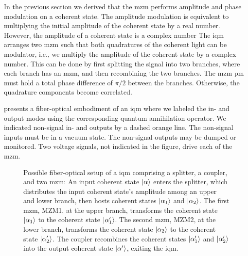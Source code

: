 In the previous section we derived that the \gls{mzm} performs amplitude and phase modulation on a coherent state.
The amplitude modulation is equivalent to multiplying the initial amplitude of the coherent state by a real number.
However, the amplitude of a coherent state is a complex number
The \gls{iqm} arranges two \gls{mzm} such that both quadratures of the coherent light can be modulator, i.e., we multiply the amplitude of the coherent state by a complex number.
This can be done by first splitting the signal into two branches, where each branch has an \gls{mzm}, and then recombining the two branches.
The \gls{mzm} \gls{pm} must hold a total phase difference of $\pi/2$ between the branches.
Otherwise, the quadrature components become correlated.

 presents a fiber-optical embodiment of an \gls{iqm} where we labeled the in- and output modes using the corresponding quantum annihilation operator.
We indicated non-signal in- and outputs by a dashed orange line.
The non-signal inputs must be in a vacuum state.
The non-signal outputs may be dumped or monitored.
Two voltage signals, not indicated in the figure, drive each of the \gls{mzm}.
\begin{figure}[htb]
	\centering
	
	\caption{Possible fiber-optical setup of a \gls{iqm} comprising a splitter, a coupler, and two \gls{mzm}: An input coherent state $\lvert\alpha\rangle$ enters the splitter, which distributes the input coherent state's amplitude among an upper and lower branch, then hosts coherent states $\lvert\alpha_1\rangle$ and $\lvert\alpha_2\rangle$. The first \gls{mzm}, MZM1, at the upper branch, transforms the coherent state $\lvert\alpha_1\rangle$ to the coherent state $\lvert\alpha_1^\prime\rangle$. The second \gls{mzm}, MZM2, at the lower branch, transforms the coherent state $\lvert\alpha_2\rangle$ to the coherent state $\lvert\alpha_2^\prime\rangle$. The coupler recombines the coherent states $\lvert\alpha_1^\prime\rangle$ and $\lvert\alpha_2^\prime\rangle$ into the output coherent state $\lvert\alpha^\prime\rangle$, exiting the \gls{iqm}.}\label{fig:iqm}
\end{figure}


